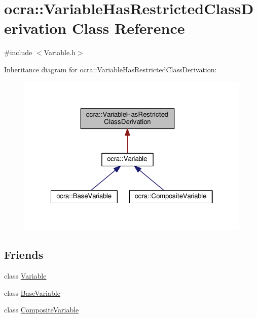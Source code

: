 \hypertarget{classocra_1_1VariableHasRestrictedClassDerivation}{}\section{ocra\+:\+:Variable\+Has\+Restricted\+Class\+Derivation Class Reference}
\label{classocra_1_1VariableHasRestrictedClassDerivation}


{\ttfamily \#include $<$Variable.\+h$>$}



Inheritance diagram for ocra\+:\+:Variable\+Has\+Restricted\+Class\+Derivation\+:
\nopagebreak
\begin{figure}[H]
\begin{center}
\leavevmode
\includegraphics[width=322pt]{d7/db2/classocra_1_1VariableHasRestrictedClassDerivation__inherit__graph}
\end{center}
\end{figure}
\subsection*{Friends}
\begin{DoxyCompactItemize}
\item 
class \hyperlink{classocra_1_1VariableHasRestrictedClassDerivation_a9b0a9a1a9dc58fc36b535bb33c612b49}{Variable}
\item 
class \hyperlink{classocra_1_1VariableHasRestrictedClassDerivation_a5136a88d8c0a1d58621286f1c82a7b45}{Base\+Variable}
\item 
class \hyperlink{classocra_1_1VariableHasRestrictedClassDerivation_a5ab4ec1f2934216b6101035293996613}{Composite\+Variable}
\end{DoxyCompactItemize}


